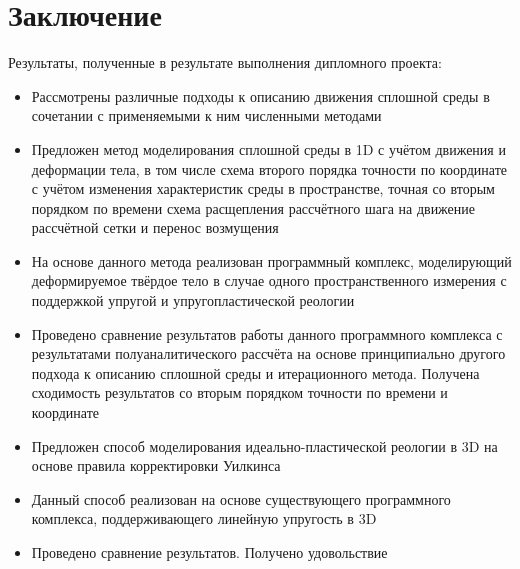 \section{Заключение}
Результаты, полученные в результате выполнения дипломного проекта:
\begin{itemize}
\item Рассмотрены различные подходы к описанию движения сплошной среды в сочетании с применяемыми к ним численными методами
\item Предложен метод моделирования сплошной среды в 1D с учётом движения и деформации тела, в том числе схема второго порядка точности по координате с учётом изменения характеристик среды в пространстве, точная со вторым порядком по времени схема расщепления рассчётного шага на движение рассчётной сетки и перенос возмущения
\item На основе данного метода реализован программный комплекс, моделирующий деформируемое твёрдое тело в случае одного пространственного измерения с поддержкой упругой и упругопластической реологии
\item Проведено сравнение результатов работы данного программного комплекса с результатами полуаналитического рассчёта на основе принципиально другого подхода к описанию сплошной среды и итерационного  метода. Получена сходимость результатов со вторым порядком точности по времени и координате
\item Предложен способ моделирования идеально-пластической реологии в 3D на основе правила корректировки Уилкинса
\item Данный способ реализован на основе существующего программного комплекса, поддерживающего линейную упругость в 3D
\item Проведено сравнение результатов. Получено удовольствие
\end{itemize}
